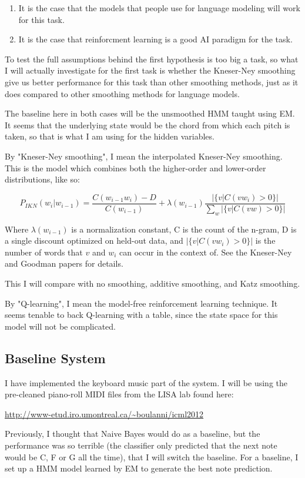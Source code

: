 \documentclass{article}
\begin{document}
\begin{enumerate}
    \item It is the case that the models that people use for language modeling will work for this task.
    \item It is the case that reinforcment learning is a good AI paradigm for the task.
\end{enumerate}

To test the full assumptions behind the first hypothesis is too big a task, so what I will actually investigate for the first task is whether the Kneser-Ney smoothing give us better performance for this task than other smoothing methods, just as it does compared to other smoothing methods for language models.

The baseline here in both cases will be the unsmoothed HMM taught using EM. It seems that the underlying state would be the chord from which each pitch is taken, so that is what I am using for the hidden variables.

By "Kneser-Ney smoothing", I mean the interpolated Kneser-Ney smoothing. This is the model which combines both the higher-order and lower-order distributions, like so:

$$P_{IKN}(w_i | w_{i-1}) = \frac{C(w_{i-1}w_i) - D}{C(w_{i-1})} + \lambda (w_{i-1}) \frac{|\{v | C(vw_i) > 0 \}|}{\sum_w |\{v|C(vw) > 0\}|}$$

Where $\lambda(w_{i-1})$ is a normalization constant, C is the count of the n-gram, D is a single discount optimized on held-out data, and $|\{v|C(vw_i) > 0\}|$ is the number of words that $v$ and $w_i$ can occur in the context of. See the Kneser-Ney and Goodman papers for details.

This I will compare with no smoothing, additive smoothing, and Katz smoothing.

By "Q-learning", I mean the model-free reinforcement learning technique. It seems tenable to back Q-learning with a table, since the state space for this model will not be complicated.

\subsection*{Baseline System}
I have implemented the keyboard music part of the system. I will be using the pre-cleaned piano-roll MIDI files from the LISA lab found here:

\url{http://www-etud.iro.umontreal.ca/~boulanni/icml2012}

Previously, I thought that Naive Bayes would do as a baseline, but the performance was so terrible (the classifier only predicted that the next note would be C, F or G all the time), that I will switch the baseline. For a baseline, I set up a HMM model learned by EM to generate the best note prediction.
\end{document}
